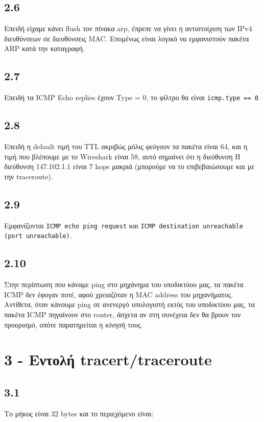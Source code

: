		\subsection*{2.6}
			Επειδή είχαμε κάνει flush τον πίνακα arp, έπρεπε να γίνει η αντιστοίχιση των IPv4 διευθύνσεων σε διευθύνσεις MAC. Επομένως είναι λογικό να εμφανιστούν πακέτα ARP κατά την καταγραφή.
	
		\subsection*{2.7}
			Επειδή τα ICMP Echo replies έχουν Type = 0, το φίλτρο θα είναι \verb|icmp.type == 0|.
	
		\subsection*{2.8}
			Επειδή η default τιμή του TTL ακριβώς μόλις φεύγουν τα πακέτα είναι 64, και η τιμή που βλέπουμε με το Wireshark είναι 58, αυτό σημαίνει ότι η διεύθυνση Η διεύθυνση 147.102.1.1 είναι 7 hops μακριά (μπορούμε να το επιβεβαιώσουμε και με την traceroute).
	
		\subsection*{2.9}
			Εμφανίζονται \verb|ICMP echo ping request| και \verb|ICMP destination unreachable (port unreachable)|.
	
		\subsection*{2.10}
			Στην περίπτωση που κάναμε ping στο μηχάνημα του υποδικτύου μας, τα πακέτα ICMP δεν έφυγαν ποτέ, αφού χρειαζόταν η MAC address του μηχανήματος. Αντίθετα, όταν κάνουμε ping σε ανενεργό υπολογιστή εκτός του υποδικτύου μας, τα πακέτα ICMP πηγαίνουν στο router, άσχετα αν στη συνέχεια δεν θα βρουν τον προορισμό, οπότε παρατηρείται η κίνησή τους. 
	
	\section*{3 - Εντολή tracert/traceroute}
	
		\subsection*{3.1}
			Το μήκος είναι 32 bytes και το περιεχόμενο είναι: \\ 
			
